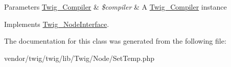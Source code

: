 \begin{DoxyParams}[1]{Parameters}
\hyperlink{classTwig__Compiler}{Twig\+\_\+\+Compiler} & {\em \$compiler} & A \hyperlink{classTwig__Compiler}{Twig\+\_\+\+Compiler} instance \\
\hline
\end{DoxyParams}


Implements \hyperlink{interfaceTwig__NodeInterface_a8d549ab245f11ac9c2d71b8de6f669e6}{Twig\+\_\+\+Node\+Interface}.



The documentation for this class was generated from the following file\+:\begin{DoxyCompactItemize}
\item 
vendor/twig/twig/lib/\+Twig/\+Node/Set\+Temp.\+php\end{DoxyCompactItemize}

